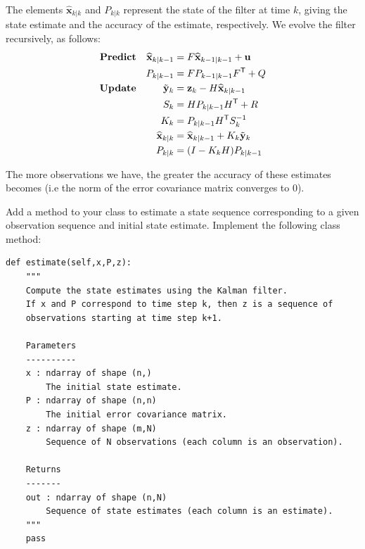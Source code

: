 The elements $\widehat{\mathbf{x}}_{k|k}$ and $P_{k|k}$ represent the state of the filter at time $k$, giving the state estimate and the accuracy of the estimate, respectively.
We evolve the filter recursively, as follows:
\begin{align*}
\textbf{Predict} & & \widehat{\mathbf{x}}_{k|k-1} & = F\widehat{\mathbf{x}}_{k-1|k-1} + \mathbf{u} \\
 & & P_{k|k-1} & = FP_{k-1|k-1}F^{\mathsf T} + Q \\
\textbf{Update} & & \tilde{\mathbf{y}}_{k} & = \mathbf{z}_{k} - H\widehat{\mathbf{x}}_{k|k-1} \\
 & & S_{k} & = HP_{k|k-1}H^{\mathsf T} + R \\
 & & K_{k} & = P_{k|k-1}H^{\mathsf T} S_{k}^{-1} \\
 & & \widehat{\mathbf{x}}_{k|k} & = \widehat{\mathbf{x}}_{k|k-1} + K_{k}\tilde{\mathbf{y}}_{k} \\
 & & P_{k|k} & = (I - K_{k}H)P_{k|k-1}
\end{align*}

The more observations we have, the greater the accuracy of these estimates becomes (i.e the norm of the error covariance matrix converges to 0).

\begin{problem}
Add a method to your  class to estimate a state sequence corresponding to a given observation sequence and initial state estimate.
Implement the following class method:
\begin{lstlisting}
def estimate(self,x,P,z):
    """
    Compute the state estimates using the Kalman filter.
    If x and P correspond to time step k, then z is a sequence of
    observations starting at time step k+1.

    Parameters
    ----------
    x : ndarray of shape (n,)
        The initial state estimate.
    P : ndarray of shape (n,n)
        The initial error covariance matrix.
    z : ndarray of shape (m,N)
        Sequence of N observations (each column is an observation).

    Returns
    -------
    out : ndarray of shape (n,N)
        Sequence of state estimates (each column is an estimate).
    """
    pass
\end{lstlisting}
\end{problem}

